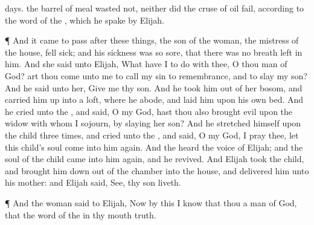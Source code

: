 {days.
 the
barrel of
meal
wasted not, neither did the
cruse of
oil
fail, according to the
word of the
{}, which he
spake
by
Elijah.
\par }{\PP {}¶ And it came to pass
after these
things,
{} the
son of the
woman, the
mistress of the
house, fell
sick; and his
sickness was
so
sore, that there was no
breath
left in him.
And she
said unto
Elijah, What have I to do with thee, O thou
man of
God? art thou
come unto me to
call my
sin to
remembrance, and to
slay my
son?
And he
said unto her,
Give me thy
son. And he
took him out of her
bosom, and carried him
up into a
loft, where he
abode, and
laid him upon his own
bed.
And he
cried unto the
{}, and
said, O
{} my
God, hast thou also brought
evil upon the
widow with whom I
sojourn, by
slaying her
son?
And he
stretched himself upon the
child
three
times, and
cried unto the
{}, and
said, O
{} my
God, I pray thee, let this
child’s
soul
come into
him
again.
And the
{}
heard the
voice of
Elijah; and the
soul of the
child
came into
him
again, and he
revived.
And
Elijah
took the
child, and brought him
down out of the
chamber into the
house, and
delivered him unto his
mother: and
Elijah
said,
See, thy
son
liveth.
\par }{\PP {}¶ And the
woman
said to
Elijah, Now by
this I
know that thou
{} a
man of
God,
{} that the
word of the
{} in thy
mouth
{}
truth.

}
